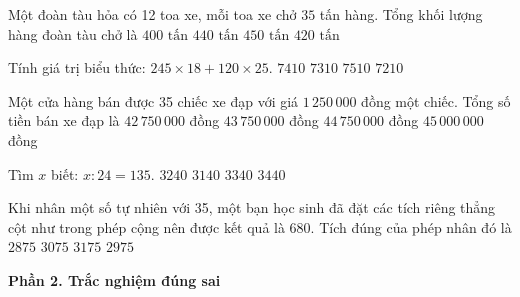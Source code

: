 \begin{ex} %
Một đoàn tàu hỏa có 12 toa xe, mỗi toa xe chở $35$ tấn hàng. Tổng khối lượng hàng đoàn tàu chở là
\choice
{$400\text{ tấn}$}
{$440\text{ tấn}$}
{$450\text{ tấn}$}
{\True $420\text{ tấn}$}
\end{ex}

\begin{ex} %
Tính giá trị biểu thức: $245 \times 18 + 120 \times 25$.
\choice
{\True $7410$}
{$7310$}
{$7510$}
{$7210$}
\end{ex}

\begin{ex} %
Một cửa hàng bán được 35 chiếc xe đạp với giá $1\,250\,000$ đồng một chiếc. Tổng số tiền bán xe đạp là
\choice
{$42\,750\,000$ đồng}
{\True $43\,750\,000$ đồng}
{$44\,750\,000$ đồng}
{$45\,000\,000$ đồng}
\end{ex}

\begin{ex} %
Tìm $x$ biết: $x : 24 = 135$.
\choice
{\True $3240$}
{$3140$}
{$3340$}
{$3440$}
\end{ex}

\begin{ex} %
Khi nhân một số tự nhiên với 35, một bạn học sinh đã đặt các tích riêng thẳng cột như trong phép cộng nên được kết quả là $680$. Tích đúng của phép nhân đó là
\choice
{$2875$}
{$3075$}
{$3175$}
{\True $2975$}
\end{ex}

\textbf{Phần 2. Trắc nghiệm đúng sai}

